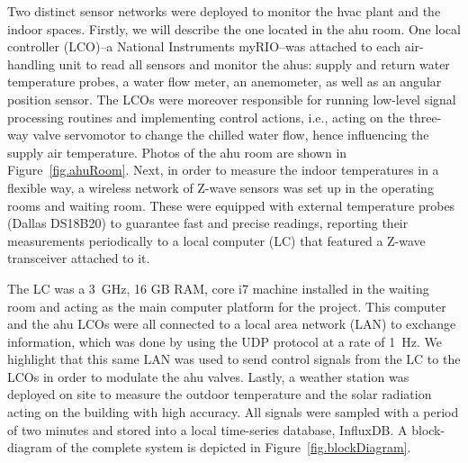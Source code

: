 Two distinct sensor networks were deployed to monitor the \ac{hvac} plant and the indoor spaces. Firstly, we will describe the one located in the \ac{ahu} room. One local controller (LCO)--a National Instruments myRIO--was attached to each air-handling unit to read all sensors and monitor the \acp{ahu}: supply and return water temperature probes, a water flow meter, an anemometer, as well as an angular position sensor. The LCOs were moreover responsible for running low-level signal processing routines and implementing control actions, i.e., acting on the three-way valve servomotor to change the chilled water flow, hence influencing the supply air temperature. Photos of the \ac{ahu} room are shown in Figure~\ref{fig.ahuRoom}. Next, in order to measure the indoor temperatures in a flexible way, a wireless network of Z-wave sensors was set up in the operating rooms and waiting room. These were equipped with external temperature probes (Dallas DS18B20) to guarantee fast and precise readings, reporting their measurements periodically to a local computer (LC) that featured a Z-wave transceiver attached to it.

The LC was a 3~GHz, 16 GB RAM, core i7 machine installed in the waiting room and acting as the main computer platform for the project. This computer and the \ac{ahu} LCOs were all connected to a local area network (LAN) to exchange information, which was done by using the UDP protocol at a rate of 1~Hz. We highlight that this same LAN was used to send control signals from the LC to the LCOs in order to modulate the \ac{ahu} valves. Lastly, a weather station was deployed on site to measure the outdoor temperature and the solar radiation acting on the building with high accuracy. All signals were sampled with a period of two minutes and stored into a local time-series database, InfluxDB. A block-diagram of the complete system is depicted in Figure~\ref{fig.blockDiagram}.  

